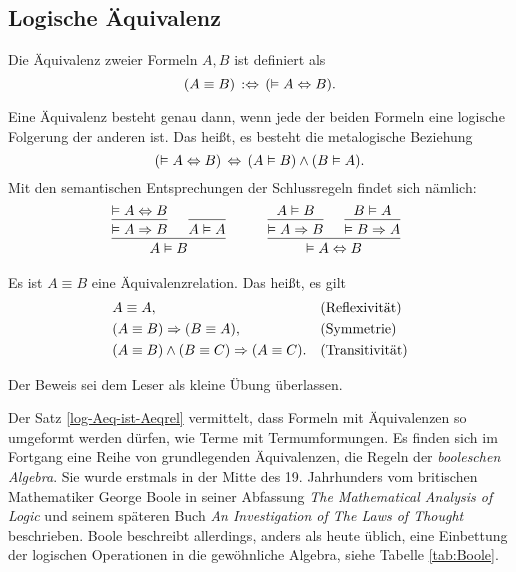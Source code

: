 \newpage
\subsection{Logische Äquivalenz}
\begin{Definition}\newlinefirst
Die Äquivalenz zweier Formeln $A,B$ ist definiert als
\[(A\equiv B)\,:\Leftrightarrow\, (\vDash A\Leftrightarrow B).\]
\end{Definition}

\noindent
Eine Äquivalenz besteht genau dann, wenn jede der beiden Formeln
eine logische Folgerung der anderen ist. Das heißt, es besteht die
metalogische Beziehung
\[(\vDash A\Leftrightarrow B)\,\Leftrightarrow\, (A\vDash B)\land (B\vDash A).\]
Mit den semantischen Entsprechungen der Schlussregeln
findet sich nämlich:
\[
\begin{array}{@{}l@{\qquad\quad}l}
\begin{prooftree}[center = false]
    \hypo{\models A\bicond B}
  \infer1{\models A\cond B}
  \infer0{A\models A}
\infer2{A\models B}
\end{prooftree}
&
\begin{prooftree}[center = false]
    \hypo{A\models B}
  \infer1{\models A\cond B}
    \hypo{B\models A}
  \infer1{\models B\cond A}
\infer2{\models A\bicond B}
\end{prooftree}
\end{array}
\]
\begin{Satz}\label{log-Aeq-ist-Aeqrel}
Es ist $A\equiv B$ eine Äquivalenzrelation. Das heißt, es gilt
\begin{align*}
& A\equiv A, &&\text{(Reflexivität)}\\
& (A\equiv B)\Rightarrow (B\equiv A), &&\text{(Symmetrie)}\\
& (A\equiv B)\land (B\equiv C)\Rightarrow (A\equiv C). &&\text{(Transitivität)}
\end{align*}
\end{Satz}
Der Beweis sei dem Leser als kleine Übung überlassen.

Der Satz \ref{log-Aeq-ist-Aeqrel} vermittelt, dass Formeln mit
Äquivalenzen so umgeformt werden dürfen, wie Terme mit Termumformungen.
Es finden sich im Fortgang eine Reihe von grundlegenden Äquivalenzen,
die Regeln der \emph{booleschen Algebra}. Sie
wurde erstmals in der Mitte des 19. Jahrhunders vom britischen
Mathematiker George Boole in seiner Abfassung \emph{The Mathematical
Analysis of Logic} und seinem späteren Buch \emph{An Investigation of
The Laws of Thought} beschrieben. Boole beschreibt allerdings, anders
als heute üblich, eine Einbettung der logischen Operationen in die
gewöhnliche Algebra, siehe Tabelle \ref{tab:Boole}.

